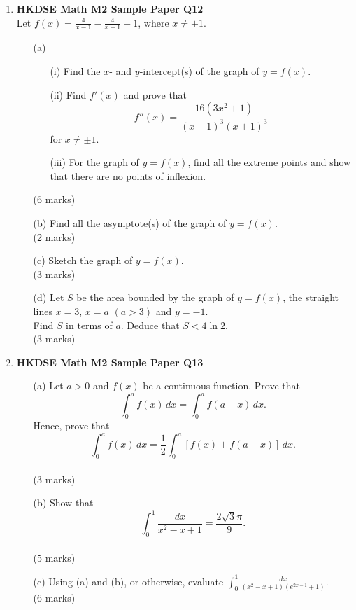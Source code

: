 \documentclass{report}
\begin{document}
\begin{enumerate}
	\item \textbf{HKDSE Math M2 Sample Paper Q12}\\
	Let $\displaystyle f(x) = \frac{4}{x-1} - \frac{4}{x+1} -1$, where $x \neq \pm 1$.
	\begin{enumerate}
		\item [(a)]
		\begin{enumerate}
			\item [(i)]Find the $x$- and $y$-intercept(s) of the graph of $y = f(x)$. 
			\item [(ii)]Find $f'(x)$ and prove that 
			$$f''(x) = \displaystyle\frac{16(3x^2 + 1)}{(x-1)^3(x+1)^3}$$
			for $x \neq \pm 1$. 
			\item [(iii)]For the graph of $y = f(x)$, find all the extreme points and show that there are no points of inflexion.
		\end{enumerate}
		(6 marks)
		\item [(b)]Find all the asymptote(s) of the graph of $y = f(x)$. \\(2 marks)
		\item [(c)]Sketch the graph of $y = f(x)$. \\(3 marks)
		\item [(d)]Let $S$ be the area bounded by the graph of $y = f(x)$, the straight lines $x = 3$, $x = a $ $(a > 3)$ and $y = -1$. \\
		Find $S$ in terms of $a$. Deduce that $S < 4\ln{2}$. \\(3 marks)
  	\end{enumerate}

	\item \textbf{HKDSE Math M2 Sample Paper Q13}
	\begin{enumerate}
		\item[(a)]Let $a > 0$ and $f(x)$ be a continuous function. Prove that $$\displaystyle\int_{0}^a f(x) \,dx = \int_{0}^a f(a-x) \,dx.$$
		Hence, prove that $$\displaystyle\int_{0}^a f(x) \,dx = \frac{1}{2}\int_{0}^a [f(x) + f(a-x)] \,dx.$$ \\(3 marks)
		\item[(b)]Show that $$\displaystyle\int_0^1 \frac{dx}{x^2-x+1} = \frac{2\sqrt{3}\pi}{9}.$$ \\(5 marks)
		\item[(c)]Using (a) and (b), or otherwise, evaluate $\displaystyle\int_0^1 \frac{dx}{(x^2-x+1)(e^{2x-1}+1)}$. \\(6 marks)
	\end{enumerate}

	\newpage


\end{enumerate}
\end{document}
